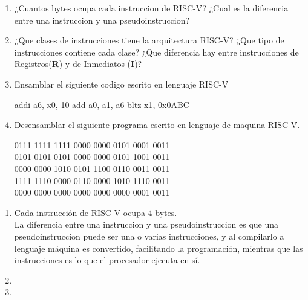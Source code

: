 \begin{enunciado}{\ejercicio}
    \begin{enumerate}
        \item ¿Cuantos bytes ocupa cada instruccion de RISC-V? ¿Cual es la diferencia entre una
        instruccion y una pseudoinstruccion?

        \item ¿Que clases de instrucciones tiene la arquitectura RISC-V? ¿Que tipo de instrucciones 
        contiene cada clase? ¿Que diferencia hay entre instrucciones de Registros(\textbf{R}) y de Inmediatos
        (\textbf{I})?

        \item Ensamblar el siguiente codigo escrito en lenguaje RISC-V
        
        \begin{riscv}
    addi a6, x0, 10
    add a0, a1, a6
    bltz x1, 0x0ABC        
        \end{riscv}

        \item Desensamblar el siguiente programa escrito en lenguaje de maquina RISC-V.

        \begin{center}
            0111 1111 1111 0000 0000 0101 0001 0011 \\
            0101 0101 0101 0000 0000 0101 1001 0011 \\
            0000 0000 1010 0101 1100 0110 0011 0011 \\
            1111 1110 0000 0110 0000 1010 1110 0011 \\
            0000 0000 0000 0000 0000 0000 0001 0011 \\
        \end{center}
    \end{enumerate}
    \end{enunciado}

\begin{enumerate}
    \item 
        Cada instrucción de RISC V ocupa 4 bytes. \\
        La diferencia entre una instruccion y una pseudoinstruccion es que una pseudoinstruccion
        puede ser una o varias instrucciones, y al compilarlo a lenguaje máquina es convertido, 
        facilitando la programación, mientras que las instrucciones es lo que el procesador ejecuta en sí.
    
    \item

    \item

\end{enumerate}
    